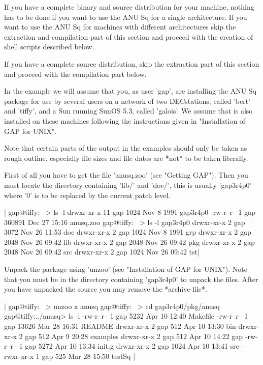If you have a complete binary and  source distribution  for your machine,
nothing has  to  be done if  you want  to use the   ANU Sq  for  a single
architecture. If you want to use  the ANU Sq  for machines with different
architectures skip  the extraction and compilation  part  of this section
and proceed with the creation of shell scripts described below.

If you have a complete source distribution,  skip the  extraction part of
this section and proceed with the compilation part below.

In the example we will assume that you, as user 'gap', are installing the
ANU Sq package for use by several users  on a network of two DECstations,
called   'bert' and  'tiffy',   and a  Sun   running  SunOS  5.3,  called
'galois'. We  assume  that {\GAP}  is also   installed on these  machines
following the instructions given in "Installation of GAP for UNIX".

Note that certain parts  of  the  output  in the examples should  only be
taken as rough outline, especially file sizes and file dates are *not* to
be taken literally.

First of  all you have to  get the file  'anusq.zoo' (see "Getting GAP").
Then you  must locate the {\GAP} directory  containing 'lib/' and 'doc/',
this is usually  'gap3r4p0' where '0'  is to be  replaced by  the current
patch level.

|    gap@tiffy:~ > ls -l
    drwxr-xr-x  11 gap     1024 Nov  8  1991 gap3r4p0
    -rw-r--r--   1 gap   360891 Dec 27 15:16 anusq.zoo
    gap@tiffy:~ > ls -l gap3r4p0
    drwxr-xr-x   2 gap     3072 Nov 26 11:53 doc
    drwxr-xr-x   2 gap     1024 Nov  8  1991 grp
    drwxr-xr-x   2 gap     2048 Nov 26 09:42 lib
    drwxr-xr-x   2 gap     2048 Nov 26 09:42 pkg
    drwxr-xr-x   2 gap     2048 Nov 26 09:42 src
    drwxr-xr-x   2 gap     1024 Nov 26 09:42 tst|

Unpack the package using 'unzoo'  (see "Installation  of GAP for  UNIX").
Note that  you must be in the  directory containing 'gap3r4p0'  to unpack
the files.    After you have  unpacked   the source  you may  remove  the
*archive-file*.

|    gap@tiffy:~ > unzoo x anusq
    gap@tiffy:~ > cd gap3r4p0/pkg/anusq
    gap@tiffy:../anusq> ls -l
    -rw-r--r--   1 gap     5232 Apr 10 12:40 Makefile
    -rw-r--r--   1 gap    13626 Mar 28 16:31 README
    drwxr-xr-x   2 gap      512 Apr 10 13:30 bin
    drwxr-xr-x   2 gap      512 Apr  9 20:28 examples
    drwxr-xr-x   2 gap      512 Apr 10 14:22 gap
    -rw-r--r--   1 gap     5272 Apr 10 13:34 init.g
    drwxr-xr-x   2 gap     1024 Apr 10 13:41 src
    -rwxr-xr-x   1 gap      525 Mar 28 15:50 testSq |

